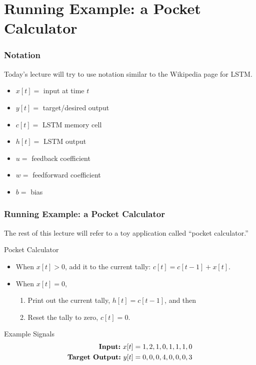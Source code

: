 \documentclass{beamer}
\begin{document}
\section[Example]{Running Example: a Pocket Calculator}
\setcounter{subsection}{1}

\begin{frame}
  \frametitle{Notation}

  Today's lecture will try to use notation similar to the Wikipedia
  page for LSTM.
  \begin{itemize}
  \item $x[t]=$ input at time $t$
  \item $y[t]=$ target/desired output
  \item $c[t]=$ LSTM memory cell
  \item $h[t]=$ LSTM output
  \item $u=$ feedback coefficient
  \item $w=$ feedforward coefficient
  \item $b=$ bias
  \end{itemize}
\end{frame}

\begin{frame}
  \frametitle{Running Example: a Pocket Calculator} The rest of this
  lecture will refer to a toy application called ``pocket calculator.''
  \begin{block}{Pocket Calculator}
    \begin{itemize}
    \item When $x[t]>0$, add it to the current tally: $c[t]=c[t-1]+x[t]$.
    \item When $x[t]=0$,
      \begin{enumerate}
      \item Print out the current tally, $h[t]=c[t-1]$, and then
      \item Reset the tally to zero, $c[t]=0$.
      \end{enumerate}
    \end{itemize}
  \end{block}
  \begin{block}{Example Signals}
    \begin{align*}
      \mbox{\bf Input:}~x[t] &= 1,2,1,0,1,1,1,0\\
      \mbox{\bf Target Output:}~y[t] &= 0,0,0,4,0,0,0,3
    \end{align*}
  \end{block}
\end{frame}
\end{document}
